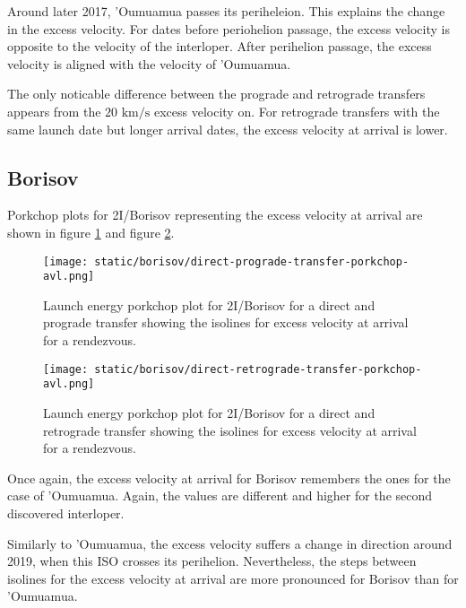Around later 2017, 'Oumuamua passes its periheleion. This explains the change in
the excess velocity. For dates before periohelion passage, the excess velocity
is opposite to the velocity of the interloper. After perihelion passage, the
excess velocity is aligned with the velocity of 'Oumuamua.

The only noticable difference between the prograde and retrograde transfers
appears from the $20\text{ km/s}$ excess velocity on. For retrograde transfers
with the same launch date but longer arrival dates, the excess velocity at
arrival is lower.


\subsection{Borisov}

Porkchop plots for 2I/Borisov representing the excess velocity at arrival are
shown in figure \ref{fig:borisov-direct-prograde-transfer-porkchop-avl} and figure
\ref{fig:borisov-direct-retrograde-transfer-porkchop-avl}.

\begin{figure}[H]
  \centering
  \texttt{[image: static/borisov/direct-prograde-transfer-porkchop-avl.png]}
        \caption[Direct and prograde arrival excess velocity porkchop for
        Borisov]{Launch energy porkchop plot for 2I/Borisov for a direct and
        prograde transfer showing the isolines for excess velocity at arrival
        for a rendezvous.}
  \label{fig:borisov-direct-prograde-transfer-porkchop-avl}
\end{figure}

\begin{figure}[H]
  \centering
  \texttt{[image: static/borisov/direct-retrograde-transfer-porkchop-avl.png]}
        \caption[Direct and retrograde arrival excess velocity porkchop for
        Borisov]{Launch energy porkchop plot for 2I/Borisov for a direct and
        retrograde transfer showing the isolines for excess velocity at arrival
        for a rendezvous.}
  \label{fig:borisov-direct-retrograde-transfer-porkchop-avl}
\end{figure}

Once again, the excess velocity at arrival for Borisov remembers the ones for
the case of 'Oumuamua. Again, the values are different and higher for the second
discovered interloper.

Similarly to 'Oumuamua, the excess velocity suffers a change in direction around
2019, when this ISO crosses its perihelion. Nevertheless, the steps between
isolines for the excess velocity at arrival are more pronounced for Borisov than
for 'Oumuamua.

